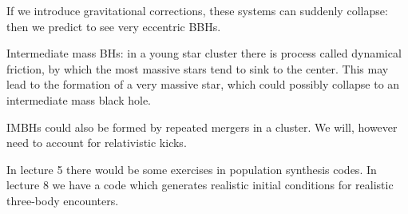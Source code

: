 \documentclass[main.tex]{subfiles}
\begin{document}
If we introduce gravitational corrections, these systems can suddenly collapse: then we predict to see very eccentric BBHs. 

Intermediate mass BHs: in a young star cluster there is  process called dynamical friction, by which the most massive stars tend to sink to the center. 
This may lead to the formation of a very massive star, which could possibly collapse to an intermediate mass black hole. 

IMBHs could also be formed by repeated mergers in a cluster. 
We will, however need to account for relativistic kicks. 

In lecture 5 there would be some exercises in population synthesis codes.
In lecture 8 we have a code which generates realistic initial conditions for realistic three-body encounters. 
\end{document}
